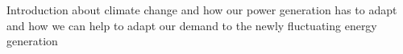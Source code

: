 Introduction about climate change and how our power generation has to adapt and how we can help to adapt our demand to the newly fluctuating energy generation